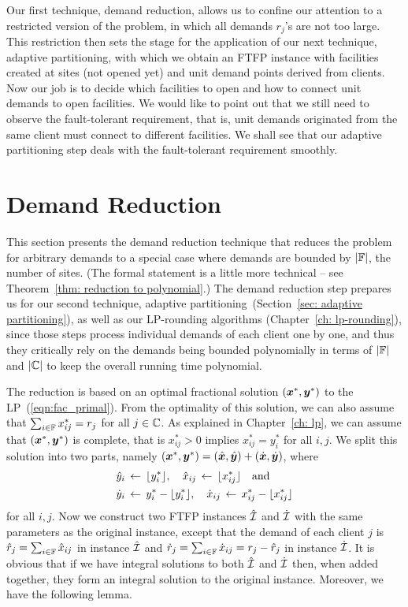 \documentclass[oneside,final]{ucr}
\begin{document}
Our first technique, demand reduction, allows us to confine
our attention to a restricted version of the {\FTFP}
problem, in which all demands $r_j$'s are not too
large. This restriction then sets the stage for the
application of our next technique, adaptive partitioning,
with which we obtain an FTFP instance with facilities
created at sites (not opened yet) and unit demand points
derived from clients. Now our job is to decide which
facilities to open and how to connect unit demands to open
facilities. We would like to point out that we still need to
observe the fault-tolerant requirement, that is, unit
demands originated from the same client must connect to
different facilities. We shall see that our adaptive
partitioning step deals with the fault-tolerant requirement
smoothly.

\section{Demand Reduction}
\label{sec: polynomial demands}

This section presents the demand reduction technique that
reduces the {\FTFP} problem for arbitrary demands to a
special case where demands are bounded by $|\mathbb{F}|$, the
number of sites.  (The formal statement is a little more
technical -- see Theorem~\ref{thm: reduction to
  polynomial}.)  The demand reduction step prepares us for
our second technique, adaptive
partitioning~(Section~\ref{sec: adaptive partitioning}), as
well as our LP-rounding algorithms (Chapter~\ref{ch:
  lp-rounding}), since those steps process individual
demands of each client one by one, and thus they critically
rely on the demands being bounded polynomially in terms of
$|\mathbb{F}|$ and $|\mathbb{C}|$ to keep the overall running
time polynomial.

The reduction is based on an optimal fractional solution
$(\boldsymbol{x}^\ast,\boldsymbol{y}^\ast)$ to the
LP~(\ref{eqn:fac_primal}). From the optimality of this
solution, we can also assume that $\sum_{i\in\mathbb{F}}
x^\ast_{ij} = r_j$ for all $j\in\mathbb{C}$.  As explained
in Chapter~\ref{ch: lp}, we can assume that
$(\boldsymbol{x}^\ast,\boldsymbol{y}^\ast)$ is complete, that is $x^\ast_{ij} >
0$ implies $x^\ast_{ij} = y^\ast_i$ for all $i,j$.  We split
this solution into two parts, namely $(\boldsymbol{x}^\ast,\boldsymbol{y}^\ast)
= (\hat{\boldsymbol{x}},\hat{\boldsymbol{y}})+ (\dot{\boldsymbol{x}},\dot{\boldsymbol{y}})$, where
%
\begin{align*}
{\hat y}_i &\;{\,\leftarrow\,}\; { \lfloor y_i^\ast \rfloor }, \quad
			{\hat x}_{ij} \;{\,\leftarrow\,}\; { \lfloor x_{ij}^\ast \rfloor } \quad\textrm{and}
			\\
{\dot y}_i &\;{\,\leftarrow\,}\; y_i^\ast - { \lfloor y_i^\ast \rfloor }, \quad
 	{\dot x}_{ij} \;{\,\leftarrow\,}\; x_{ij}^\ast -  { \lfloor x_{ij}^\ast \rfloor }
\end{align*}
%
for all $i,j$. Now we construct two
FTFP instances $\hatcalI$ and $\dotcalI$ with the same
parameters as the original instance, except that the demand of each client $j$ is
${\hat r}_j = \sum_{i\in\mathbb{F}} {\hat x}_{ij}$ in instance $\hatcalI$ and
${\dot r}_j = \sum_{i\in\mathbb{F}} {\dot x}_{ij} = r_j - {\hat r}_j$ in instance $\dotcalI$. 
It is obvious that if we have integral solutions to both $\hatcalI$
and $\dotcalI$ then, when added together, they form an integral
solution to the original instance.  Moreover, we have the
following lemma.
\end{document}
